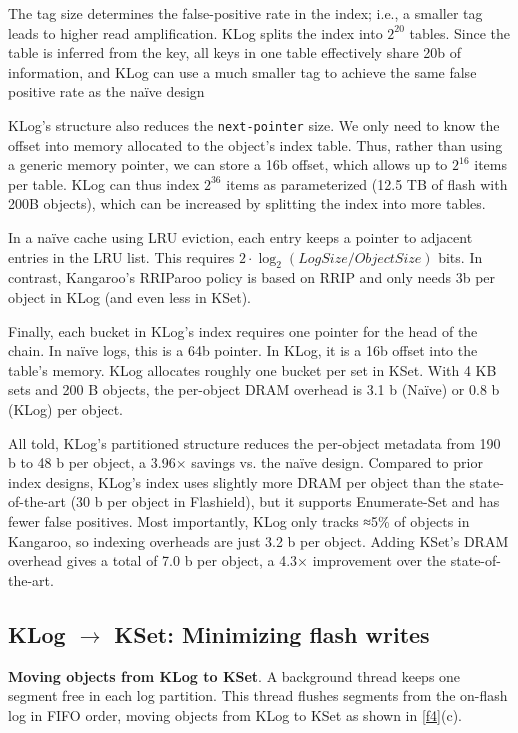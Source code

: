 \documentclass[11pt]{article}
\begin{document}
The tag size determines the false-positive rate in the index; i.e., a smaller tag leads to higher read
amplification. KLog splits the index into \(2^{20}\) tables. Since the table is inferred from the key, all
keys in one table effectively share 20b of information, and KLog can use a much smaller tag to achieve
the same false positive rate as the naïve design

KLog’s structure also reduces the \texttt{next-pointer} size. We only need to know the offset into memory
allocated to the object’s index table. Thus, rather than using a generic memory pointer, we can store
a 16b offset, which allows up to \(2^{16}\) items per table. KLog can thus index \(2^{36}\) items as
parameterized (12.5 TB of flash with 200B objects), which can be increased by splitting the index into
more tables.

In a naïve cache using LRU eviction, each entry keeps a pointer to adjacent entries in the LRU list.
This requires \(2\cdot\log_2(LogSize/ObjectSize)\) bits. In contrast, Kangaroo’s RRIParoo policy is
based on RRIP and only needs 3b per object in KLog (and even less in KSet).

Finally, each bucket in KLog’s index requires one pointer for the head of the chain. In naïve logs,
this is a 64b pointer. In KLog, it is a 16b offset into the table’s memory. KLog allocates roughly one
bucket per set in KSet. With 4 KB sets and 200 B objects, the per-object DRAM overhead is 3.1 b
(Naïve) or 0.8 b (KLog) per object.

All told, KLog’s partitioned structure reduces the per-object metadata from 190 b to 48 b per object,
a 3.96× savings vs. the naïve design. Compared to prior index designs, KLog’s index uses slightly more
DRAM per object than the state- of-the-art (30 b per object in Flashield), but it supports
Enumerate-Set and has fewer false positives. Most importantly, KLog only tracks ≈5\% of objects in
Kangaroo, so indexing overheads are just 3.2 b per object. Adding KSet’s DRAM overhead gives a total
of 7.0 b per object, a 4.3× improvement over the state-of-the-art.
\subsection{KLog \texorpdfstring{\(\to\)}{to} KSet: Minimizing flash writes}
\label{sec:orgaad5b1f}
\textbf{Moving objects from KLog to KSet}. A background thread keeps one segment free in each log partition.
 This thread flushes segments from the on-flash log in FIFO order, moving objects from KLog to KSet as
 shown in \ref{f4}(c).
\end{document}

